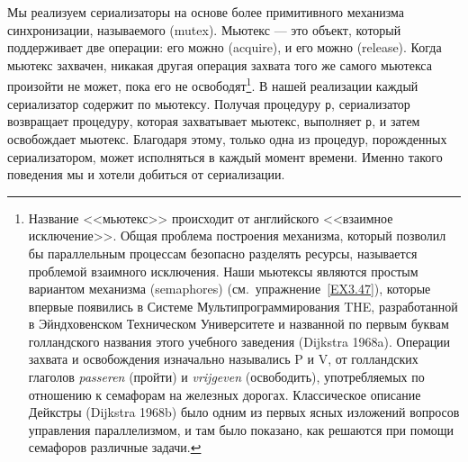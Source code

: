 Мы реализуем сериализаторы на основе более примитивного
механизма  синхронизации, называемого
 (mutex).  Мьютекс ---
это объект, который
поддерживает две операции:
его можно  (acquire), и его можно
 (release).
Когда мьютекс
захвачен, никакая другая операция захвата того же самого мьютекса
произойти не может, пока его не освободят\footnote{Название <<мьютекс>> происходит от английского
 <<взаимное исключение>>.  Общая проблема
построения механизма, который позволил бы параллельным процессам
безопасно разделять ресурсы, называется проблемой взаимного
исключения.  Наши мьютексы являются простым вариантом механизма
 (semaphores)
(см.~упражнение~\ref{EX3.47}),
которые впервые появились в
Системе
Мультипрограммирования THE, разработанной в
Эйндховенском
Техническом
Университете и названной по первым буквам голландского названия этого
учебного заведения (Dijkstra 1968a).
Операции захвата и
освобождения изначально назывались P и V, от
голландских глаголов
{\em passeren} (пройти) и {\em vrijgeven} (освободить),
употребляемых по отношению к семафорам на железных дорогах.
Классическое описание Дейкстры (Dijkstra 1968b)
было одним из первых ясных изложений вопросов управления
параллелизмом, и там было показано, как решаются  при помощи семафоров
различные задачи.}.
В нашей реализации каждый сериализатор содержит по мьютексу.  Получая
процедуру {\tt p}, сериализатор возвращает процедуру,
которая захватывает мьютекс, выполняет {\tt p}, и затем
освобождает мьютекс.  Благодаря этому, только одна из процедур,
порожденных сериализатором, может исполняться в каждый момент времени.
Именно такого поведения мы и хотели добиться от сериализации.

